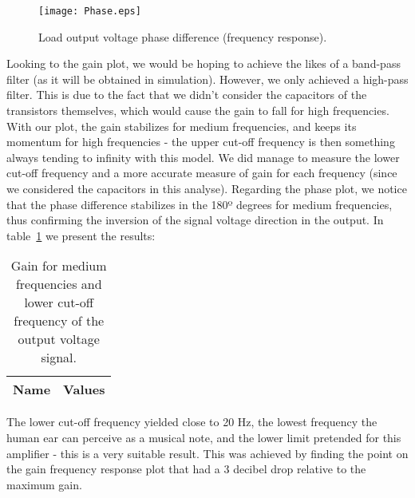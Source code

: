 \begin{figure}[!h] \centering
\texttt{[image: Phase.eps]}
\caption{Load output voltage phase difference (frequency response).}
\label{fig:phasefreq}
\end{figure}

\pagebreak

Looking to the gain plot, we would be hoping to achieve the likes of a band-pass filter (as it will be obtained in simulation). However, we only achieved a high-pass filter. This is due to the fact that we didn't consider the capacitors of the transistors themselves, which would cause the gain to fall for high frequencies. With our plot, the gain stabilizes for medium frequencies, and keeps its momentum for high frequencies - the upper cut-off frequency is then something always tending to infinity with this model. We did manage to measure the lower cut-off frequency and a more accurate measure of gain for each frequency (since we considered the capacitors in this analyse). Regarding the phase plot, we notice that the phase difference stabilizes in the 180º degrees for medium frequencies, thus confirming the inversion of the signal voltage direction in the output. In table~\ref{tab:freq} we present the results:

\begin{table}[h]
  \centering
  \begin{tabular}{|l|r|}
    \hline    
    {\bf Name} & {\bf Values} \\ \hline
     
  \end{tabular}
  \caption{Gain for medium frequencies and lower cut-off frequency of the output voltage signal.}
  \label{tab:freq}
\end{table}

The lower cut-off frequency yielded close to 20 Hz, the lowest frequency the human ear can perceive as a musical note, and the lower limit pretended for this amplifier - this is a very suitable result. This was achieved by finding the point on the gain frequency response plot that had a 3 decibel drop relative to the maximum gain.
